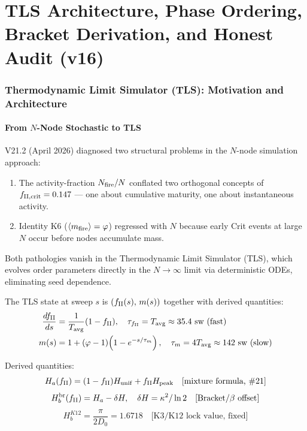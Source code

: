 \documentclass[12pt, a4paper]{article}
\begin{document}
\part{TLS Architecture, Phase Ordering, Bracket Derivation, and Honest Audit (v16)}

\section{Thermodynamic Limit Simulator (TLS): Motivation and Architecture}

\subsection{From $N$-Node Stochastic to TLS}

V21.2 (April 2026) diagnosed two structural problems in the $N$-node simulation approach:
\begin{enumerate}
\item The activity-fraction $N_{\rm fire}/N$ conflated two orthogonal concepts of $f_{\rm II,crit} = 0.147$ --- one about cumulative maturity, one about instantaneous activity.
\item Identity K6 ($\langle m_{\rm fire}\rangle = \varphi$) regressed with $N$ because early Crit events at large $N$ occur before nodes accumulate mass.
\end{enumerate}
Both pathologies vanish in the Thermodynamic Limit Simulator (TLS), which evolves order parameters directly in the $N\to\infty$ limit via deterministic ODEs, eliminating seed dependence.

\begin{formalbox}[title={TLS State Vector and Evolution (TLS v2/v3)}]
The TLS state at sweep $s$ is $(f_{\rm II}(s),\, m(s))$ together with derived quantities:
\begin{align*}
  \frac{df_{\rm II}}{ds} &= \frac{1}{T_{\rm avg}}(1 - f_{\rm II}), \quad \tau_{f_{\rm II}} = T_{\rm avg} \approx 35.4\ \text{sw (fast)}\\
  m(s) &= 1 + (\varphi-1)\!\left(1 - e^{-s/\tau_m}\right), \quad \tau_m = 4T_{\rm avg} \approx 142\ \text{sw (slow)}
\end{align*}

Derived quantities:
\[
  H_a(f_{\rm II}) = (1-f_{\rm II})H_{\rm unif} + f_{\rm II}H_{\rm peak}
  \quad\text{[mixture formula, \#21]}
\]
\[
  H_b^{\rm br}(f_{\rm II}) = H_a - \delta H, \quad \delta H = \kappa^2/\ln 2
  \quad\text{[Bracket/}\beta\text{ offset]}
\]
\[
  H_b^{K12} = \frac{\pi}{2D_0} = 1.6718
  \quad\text{[K3/K12 lock value, fixed]}
\]
\end{formalbox}
\end{document}
